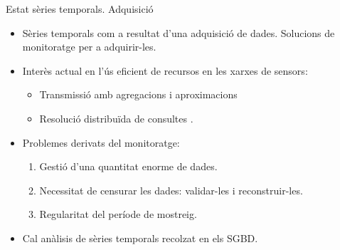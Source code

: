 \begin{frame}{Estat sèries temporals. Adquisició}

  \begin{itemize}

  \item Sèries temporals com a resultat d'una adquisició de
    dades. Solucions de monitoratge per a adquirir-les.

  \item Interès actual en l'ús eficient de recursos en les xarxes de
    sensors: 
    \begin{itemize}
    \item Transmissió amb agregacions i
      aproximacions \parencite{deligiannakis07}
    \item Resolució distribuïda de consultes \parencite{bonnet01}.
    \end{itemize}

  \item Problemes derivats del monitoratge:
    \begin{enumerate}

    \item Gestió d'una quantitat enorme de dades. 

    \item Necessitat de censurar les dades: validar-les i reconstruir-les.

    \item Regularitat del període de mostreig.

    \end{enumerate}
  

  \item Cal anàlisis de sèries temporals recolzat en els SGBD.

  \end{itemize}


\end{frame}



